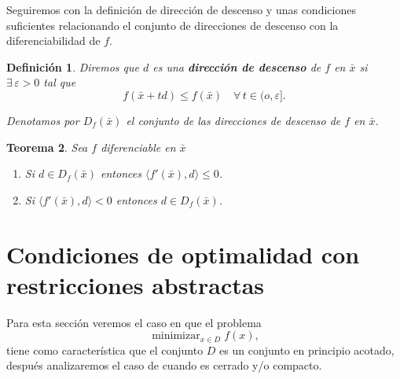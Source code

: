 \documentclass[a4paper,12pt]{report}
\newcommand{\la}{\langle}
\newcommand{\ra}{\rangle}
\newcommand{\bx}{\bar{x}}
\newcommand{\mini}{\mathop{\mathrm{minimizar}}_{x\in D}f(x)}
\newcommand{\arr}{\rightarrow}
\newtheorem{teo}{Teorema}[section]
\newtheorem{defi}[teo]{Definici\'on}
\newenvironment{dem}{\vspace*{-0.1cm}{\it Demostraci\'on:}}{\hfill
$\blacksquare$\\}
\begin{document}
Seguiremos con la definici\'on de direcci\'on de descenso y unas condiciones suficientes relacionando el conjunto de direcciones de descenso con la di\-fe\-ren\-cia\-bi\-li\-dad de $f$.

\begin{defi}\label{def:descenso}
Diremos que $d$ es una \textbf{direcci\'on de descenso} de $f$ en $\bx$ si $\exists\,\varepsilon >0$ tal que $$f(\bx+td)\leq f(\bx)\quad\forall\, t\in (o,\varepsilon].$$

Denotamos por $D_f (\bx)$ el conjunto de las direcciones de descenso de $f$ en $\bx$.
\end{defi}


\begin{teo}\label{teo:descenso}
Sea $f$ diferenciable en $\bx$
\begin{enumerate}
\item Si $d\in D_f (\bx)$ entonces $\la f'(\bx),d\ra \leq 0$.
\item Si $\la f'(\bx),d\ra < 0$ entonces $d\in D_f (\bx)$.
\end{enumerate}
\end{teo}

\section{Condiciones de optimalidad con restricciones abstractas}

Para esta secci\'on veremos el caso en que el problema 
\begin{equation}\label{mcr}
\mini,
\end{equation}
tiene como caracter\'istica que el conjunto $D$ es un conjunto en principio acotado, despu\'es analizaremos el caso de cuando es cerrado y/o compacto.
\end{document}
